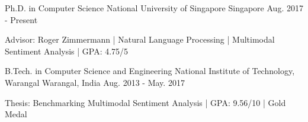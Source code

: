 

\begin{cventries}

  \cventryleft
    {Ph.D. in Computer Science}
    {National University of Singapore}
    {Singapore}
    {Aug. 2017 - Present}
    {
      \begin{cvitems}
        \item {Advisor: Roger Zimmermann  | Natural Language Processing | Multimodal Sentiment Analysis | GPA: 4.75/5 }
      \end{cvitems}
    }

  \cventryleft
    {B.Tech. in Computer Science and Engineering}
    {National Institute of Technology, Warangal}
    {Warangal, India}
    {Aug. 2013 - May. 2017}
    {
      \begin{cvitems}
        \item {Thesis: Benchmarking Multimodal Sentiment Analysis  |  GPA: 9.56/10  |  Gold Medal}
      \end{cvitems}
    }

\end{cventries}
